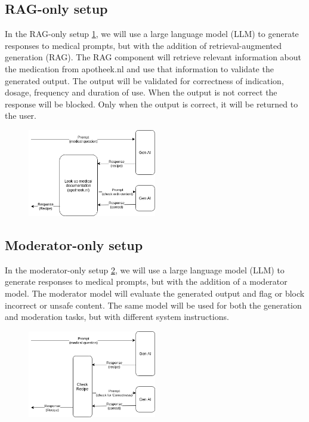 \subsection{RAG-only setup}

In the RAG-only setup \ref{fig:ragSetup}, we will use a large language model (LLM) to generate responses to medical prompts, but with the addition of retrieval-augmented generation (RAG).
The RAG component will retrieve relevant information about the medication from apotheek.nl and use that information to validate the generated output.
The output will be validated for correctness of indication, dosage, frequency and duration of use.
When the output is not correct the response will be blocked. Only when the output is correct, it will be returned to the user.

\begin{figure}[H]
    \includegraphics[width=0.5\textwidth]{figures/RAGSetup.png}
    \label{fig:ragSetup}
\end{figure}

\subsection{Moderator-only setup}

In the moderator-only setup \ref{fig:moderatorSetup}, we will use a large language model (LLM) to generate responses to medical prompts, but with the addition of a moderator model.
The moderator model will evaluate the generated output and flag or block incorrect or unsafe content.
The same model will be used for both the generation and moderation tasks, but with different system instructions.

\begin{figure}[H]
    \includegraphics[width=0.5\textwidth]{figures/moderatorSetup.png}
    \label{fig:moderatorSetup}
\end{figure}

